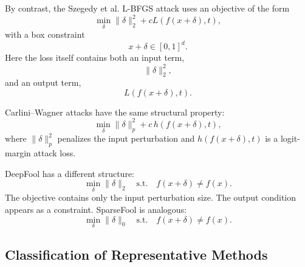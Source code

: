 \documentclass{article}
\begin{document}
By contrast, the Szegedy et al. L-BFGS attack uses an objective of the form
\[
    \min_\delta
    \|\delta\|_2^2
    +
    cL(f(x+\delta),t),
\]
with a box constraint
\[
    x+\delta\in[0,1]^d.
\]
Here the loss itself contains both an input term,
\[
    \|\delta\|_2^2,
\]
and an output term,
\[
    L(f(x+\delta),t).
\]

Carlini--Wagner attacks have the same structural property:
\[
    \min_\delta
    \|\delta\|_p^2
    +
    c\,h(f(x+\delta),t),
\]
where \(\|\delta\|_p^2\) penalizes the input perturbation and \(h(f(x+\delta),t)\) is a logit-margin attack loss.

DeepFool has a different structure:
\[
    \min_\delta \|\delta\|_2
    \quad
    \text{s.t.}
    \quad
    f(x+\delta)\neq f(x).
\]
The objective contains only the input perturbation size. The output condition appears as a constraint. SparseFool is analogous:
\[
    \min_\delta \|\delta\|_0
    \quad
    \text{s.t.}
    \quad
    f(x+\delta)\neq f(x).
\]

\subsection{Classification of Representative Methods}
\end{document}
